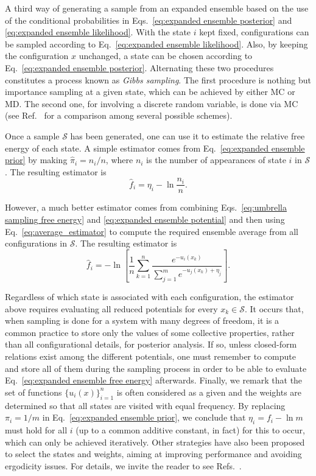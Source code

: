 \documentclass[aip,jcp,reprint,amsmath,amssymb]{revtex4-1}
\begin{document}
A third way of generating a sample from an expanded ensemble based on the use of the conditional probabilities in Eqs.~\eqref{eq:expanded ensemble posterior} and \eqref{eq:expanded ensemble likelihood}. With the state $i$ kept fixed, configurations can be sampled according to Eq.~\eqref{eq:expanded ensemble likelihood}. Also, by keeping the configuration $x$ unchanged, a state can be chosen according to Eq.~\eqref{eq:expanded ensemble posterior}. Alternating these two procedures constitutes a process known as \textit{Gibbs sampling}.\cite{Chodera_2011} The first procedure is nothing but importance sampling at a given state, which can be achieved by either MC or MD. The second one, for involving a discrete random variable, is done via MC (see Ref.~ for a comparison among several possible schemes).

Once a sample $\mathcal S$ has been generated, one can use it to estimate the relative free energy of each state. A simple estimator comes from Eq.~\eqref{eq:expanded ensemble prior} by making $\hat \pi_i = n_i/n$, where $n_i$ is the number of appearances of state $i$ in $\mathcal S$. The resulting estimator is
\begin{equation}
\label{eq:expanded ensemble histogram estimator}
\hat f_i = \eta_i - \ln \frac{n_i}{n}.
\end{equation}

However, a much better estimator comes from combining Eqs.~\eqref{eq:umbrella sampling free energy} and \eqref{eq:expanded ensemble potential} and then using Eq.~\eqref{eq:average_estimator} to compute the required ensemble average from all configurations in $\mathcal S$. The resulting estimator is
\begin{equation}
\label{eq:expanded ensemble FEP estimator}
\hat f_i = -\ln \left[ \frac{1}{n}\sum_{k=1}^n \frac{e^{-u_i(x_k)}}{\sum_{j=1}^m e^{-u_j(x_k) + \eta_j}} \right].
\end{equation}

Regardless of which state is associated with each configuration, the estimator above requires evaluating all reduced potentials for every $x_k \in \mathcal S$. It occurs that, when sampling is done for a system with many degrees of freedom, it is a common practice to store only the values of some collective properties, rather than all configurational details, for posterior analysis. If so, unless closed-form relations exist among the different potentials, one must remember to compute and store all of them during the sampling process in order to be able to evaluate Eq.~\eqref{eq:expanded ensemble free energy} afterwards. Finally, we remark that the set of functions $\{u_i(x)\}_{i=1}^n$ is often considered as a given and the weights are determined so that all states are visited with equal frequency. By replacing $\pi_i = 1/m$ in Eq.~\eqref{eq:expanded ensemble prior}, we conclude that $\eta_i = f_i - \ln m$ must hold for all $i$ (up to a common additive constant, in fact) for this to occur, which can only be achieved iteratively. Other strategies have also been proposed to select the states and weights, aiming at improving performance and avoiding ergodicity issues. For details, we invite the reader to see Refs.~.
\end{document}
